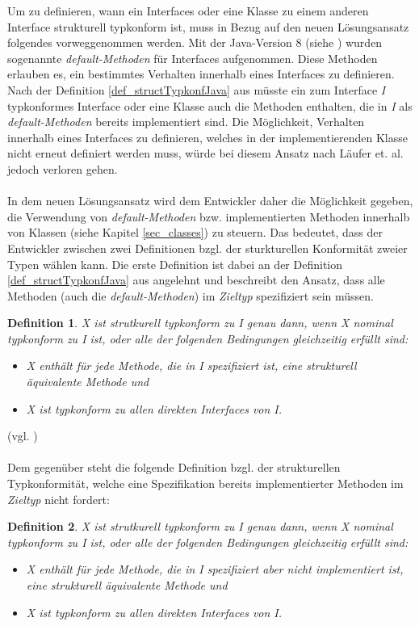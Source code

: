 \documentclass[11pt, 
ngerman,
doublespacing,
chapterinoneline, %
consistentlayout, %
]{scrartcl}
\newtheorem{definition}{Definition}
\begin{document}
Um zu definieren, wann ein Interfaces oder eine Klasse zu einem anderen Interface strukturell typkonform ist, muss in Bezug auf den neuen Lösungsansatz folgendes vor\-weggenommen werden. Mit der Java-Version 8 (siehe \cite{javaspec8}) wurden sogenannte \emph{default-Methoden} für Interfaces aufgenommen. Diese Methoden erlauben es, ein bestimmtes Verhalten innerhalb eines Interfaces zu definieren. Nach der Definition \ref{def_structTypkonfJava} aus \cite{structconfjava} müsste ein zum Interface \emph{I} typkonformes Interface oder eine Klasse auch die Methoden enthalten, die in \emph{I} als \emph{default-Methoden} bereits implementiert sind. Die Möglichkeit, Verhalten innerhalb eines Interfaces zu definieren, welches in der implementierenden Klasse nicht erneut definiert werden muss, würde bei diesem Ansatz nach Läufer et. al. \cite{structconfjava} jedoch verloren gehen.\\\\
In dem neuen Lösungsansatz wird dem Entwickler daher die Möglichkeit gegeben, die Verwendung von \emph{default-Methoden} bzw. implementierten Methoden innerhalb von Klas\-sen (siehe Kapitel \ref{sec_classes}) zu steuern. Das bedeutet, dass der Entwickler zwischen zwei Definitionen bzgl. der sturkturellen Konformität zweier Typen wählen kann. Die erste Definition ist dabei an der Definition \ref{def_structTypkonfJava} aus \cite{structconfjava} angelehnt und beschreibt den Ansatz, dass alle Methoden (auch die \emph{default-Methoden}) im \emph{Zieltyp} spezifiziert sein müssen.\pagebreak
\begin{definition}\label{def_structTypkonfJava_V1}
\emph{X} ist strutkurell typkon\-form zu \emph{I} genau dann, wenn \emph{X} nominal typkon\-form zu \emph{I} ist, oder alle der folgenden Bedingungen gleichzeitig erfüllt sind:
\begin{itemize}
\item \emph{X} enthält für jede Methode, die in \emph{I} spezifiziert ist, eine strukturell äquivalente Methode und
\item \emph{X} ist typkonform zu allen direkten Interfaces von \emph{I}.
\end{itemize}
\end{definition} (vgl. \cite{structconfjava})\\\\
Dem gegenüber steht die folgende Definition bzgl. der strukturellen Typkonformität, welche eine Spezifikation bereits implementierter Methoden im \emph{Zieltyp} nicht fordert:
\begin{definition}\label{def_structTypkonfJava_V2}
\emph{X} ist strutkurell typkon\-form zu \emph{I} genau dann, wenn \emph{X} nominal typkon\-form zu \emph{I} ist, oder alle der folgenden Bedingungen gleichzeitig erfüllt sind:
\begin{itemize}
\item \emph{X} enthält für jede Methode, die in \emph{I} spezifiziert aber nicht implementiert ist, eine strukturell äquivalente Methode und
\item \emph{X} ist typkonform zu allen direkten Interfaces von \emph{I}.
\end{itemize}
\end{definition}
\end{document}
